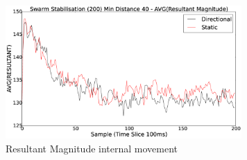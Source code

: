 \documentclass[10pt,journal,letterpaper,twoside]{IEEEtran}
\newcommand{\stability}{internal movement}
\begin{document}
\begin{figure}[H]
\begin{center}
\includegraphics[width=9cm]{figures/StabilityDistanceSwarmDirectionAVGMAG}
\end{center}
\caption{Resultant Magnitude \stability{}\label{methods:StabilityDistanceSwarmDirectionAVGMAG}}
\end{figure}




\end{document}
